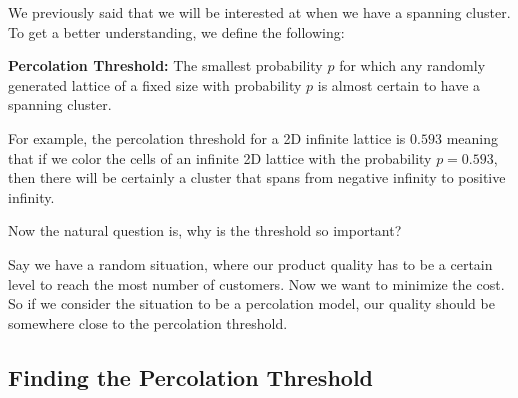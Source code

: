 \documentclass[compress]{beamer}
\newcommand{\imp}[1]{\textcolor{NordRed}{#1}}
\begin{document}
\begin{frame}
    We previously said that we will be interested at when we have a spanning cluster. To
    get a better understanding, we define the following:

    \vspace{12pt}

    \imp{\textbf{Percolation Threshold:}} \textcolor{NordOrange}{The smallest probability
    \(p\) for which any randomly generated lattice of a fixed size with probability \(p\)
    is almost certain to have a spanning cluster.}

\end{frame}

\begin{frame}
    For example, the percolation threshold for a 2D infinite lattice is \(0.593\) meaning
    that if we color the cells of an infinite 2D lattice with the probability \(p=0.593\),
    then there will be certainly a cluster that spans from negative infinity to positive
    infinity.
\end{frame}

\begin{frame}
    Now the natural question is, why is the threshold so important?

    \vspace{12pt}

    Say we have a random situation, where our product quality has to be a certain level to
    reach the most number of customers. Now we want to minimize the cost. So if we
    consider the situation to be a percolation model, our quality should be somewhere
    close to the percolation threshold.
\end{frame}

\subsection{Finding the Percolation Threshold}
\end{document}
